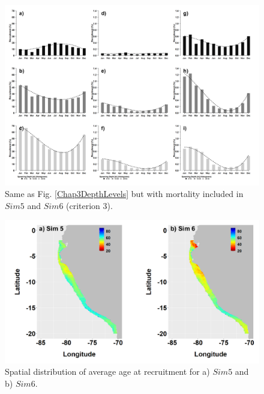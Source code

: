\begin{figure}[H]
	\includegraphics[width=1.0\textwidth]{figures/Chap3DepthLevelsMortality.png}
	\centering
	\caption{Same as Fig. \ref{Chap3DepthLevels} but with mortality included in $Sim 5$ and $Sim 6$ (criterion 3).}
	\label{Chap3DepthLevelsMortality}
\end{figure}



\begin{figure}[H]
	\includegraphics[width=1.0\textwidth]{figures/Chap3MapAgeRecruSim5Sim6.png}
	\centering
	\caption{Spatial distribution of average age at recruitment for a) $Sim5$ and b) $Sim6$.}
	\label{Chap3MapAgeRecruSim5Sim6}
\end{figure}

